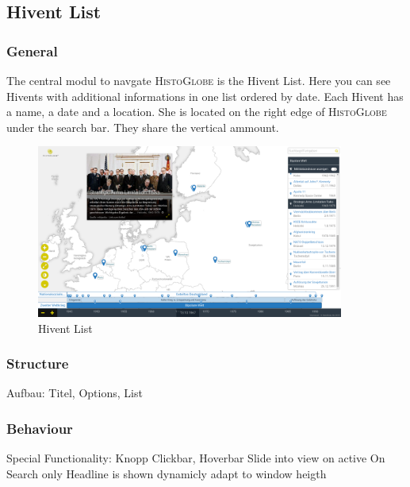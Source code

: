 \subsection{Hivent List}

\subsubsection{General} %
\label{ssub:general_hl}
The central modul to navgate \textsc{HistoGlobe} is the Hivent List. Here you can see Hivents with additional informations in one list ordered by date. Each Hivent has a name, a date and a location. She is located on the right edge of \textsc{HistoGlobe} under the search bar. They share the vertical ammount.

\begin{figure}[H]
  \centering
  \includegraphics[width=0.9\textwidth]{graphics/final_ui.png}
  \caption{Hivent List}
\end{figure}

\subsubsection{Structure} %
\label{ssub:structure_hl}
Aufbau: Titel, Options, List


\subsubsection{Behaviour} %
\label{ssub:behaviour_hl}
Special Functionality: Knopp
Clickbar, Hoverbar
Slide into view on active
On Search only Headline is shown
dynamicly adapt to window heigth